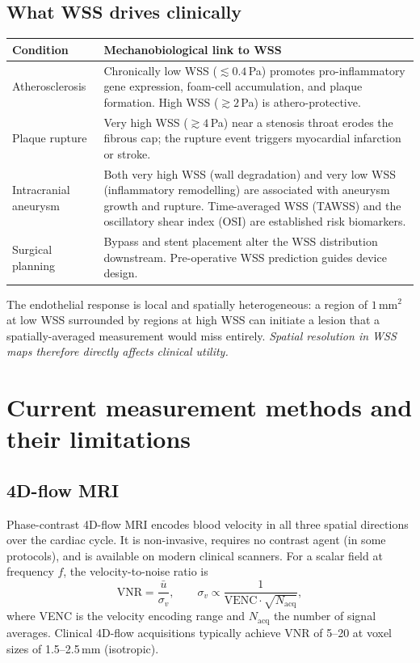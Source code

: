 \documentclass[11pt]{article}
\begin{document}
\subsection*{What WSS drives clinically}

\begin{tabularx}{\textwidth}{l X}
\toprule
\textbf{Condition} & \textbf{Mechanobiological link to WSS} \\
\midrule
Atherosclerosis
  & Chronically low WSS ($\lesssim 0.4$\,Pa) promotes pro-inflammatory gene expression,
    foam-cell accumulation, and plaque formation.  High WSS ($\gtrsim 2$\,Pa) is athero-protective. \\[4pt]
Plaque rupture
  & Very high WSS ($\gtrsim 4$\,Pa) near a stenosis throat erodes the fibrous cap;
    the rupture event triggers myocardial infarction or stroke. \\[4pt]
Intracranial aneurysm
  & Both very high WSS (wall degradation) and very low WSS (inflammatory
    remodelling) are associated with aneurysm growth and rupture.
    Time-averaged WSS (TAWSS) and the oscillatory shear index (OSI)
    are established risk biomarkers. \\[4pt]
Surgical planning
  & Bypass and stent placement alter the WSS distribution downstream.
    Pre-operative WSS prediction guides device design. \\
\bottomrule
\end{tabularx}

\medskip
The endothelial response is local and spatially heterogeneous: a region of
$1\,\text{mm}^2$ at low WSS surrounded by regions at high WSS can initiate a lesion
that a spatially-averaged measurement would miss entirely.  \emph{Spatial resolution
in WSS maps therefore directly affects clinical utility.}

\section{Current measurement methods and their limitations}

\subsection*{4D-flow MRI}
Phase-contrast 4D-flow MRI encodes blood velocity in all three spatial directions
over the cardiac cycle.  It is non-invasive, requires no contrast agent (in some
protocols), and is available on modern clinical scanners.  For a scalar field at
frequency $f$, the velocity-to-noise ratio is
\[
    \mathrm{VNR} = \frac{\bar{u}}{\sigma_v},
    \qquad
    \sigma_v \propto \frac{1}{\mathrm{VENC} \cdot \sqrt{N_{\text{acq}}}},
\]
where VENC is the velocity encoding range and $N_{\text{acq}}$ the number of signal
averages.  Clinical 4D-flow acquisitions typically achieve VNR of 5--20 at voxel
sizes of 1.5--2.5\,mm (isotropic).
\end{document}
